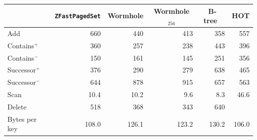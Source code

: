 \begin{tabular}{lrrrrr}
&\multicolumn{1}{c}{\texttt{ZFastPagedSet}}&\multicolumn{1}{c}{Wormhole}&\multicolumn{1}{c}{Wormhole$_{256}$}&\multicolumn{1}{c}{B-tree~\cite{Muller2025BTrees}}&\multicolumn{1}{c}{HOT}\\
\hline
Add & 660 & 440 & 413 & 358 & 557\\
Contains$^+$ & 360 & 257 & 238 & 443 & 396\\
Contains$^-$ & 150 & 161 & 145 & 251 & 356\\
Successor$^+$ & 376 & 290 & 279 & 638 & 465\\
Successor$^-$ & 644 & 878 & 915 & 657 & 563\\
Scan & 10.4 & 10.2 & 9.6 & 8.3 & 46.6\\
Delete & 518 & 368 & 343 & 640 & \\
\hline
Bytes per key & 108.0 & 126.1 & 123.2 & 130.2 & 106.0\\
\end{tabular}
